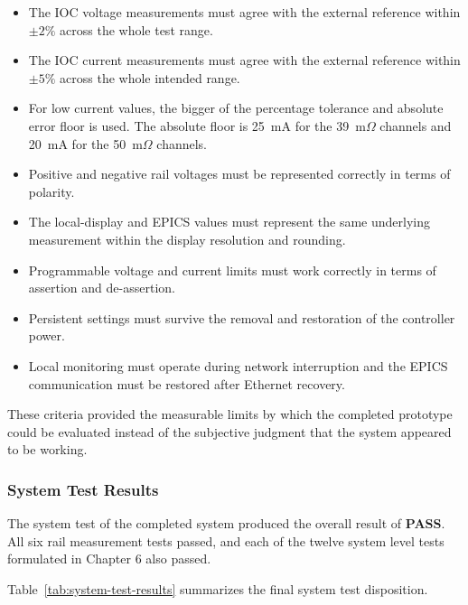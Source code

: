 \begin{itemize}
    \item The IOC voltage measurements must agree with the external reference within $\pm2\%$ across the whole test range.
    \item The IOC current measurements must agree with the external reference within $\pm5\%$ across the whole intended range.
    \item For low current values, the bigger of the percentage tolerance and absolute error floor is used. The absolute floor is 25~mA for the 39~m$\Omega$ channels and 20~mA for the 50~m$\Omega$ channels.
    \item Positive and negative rail voltages must be represented correctly in terms of polarity.
    \item The local-display and EPICS values must represent the same underlying measurement within the display resolution and rounding.
    \item Programmable voltage and current limits must work correctly in terms of assertion and de-assertion.
    \item Persistent settings must survive the removal and restoration of the controller power.
    \item Local monitoring must operate during network interruption and the EPICS communication must be restored after Ethernet recovery.
\end{itemize}

These criteria provided the measurable limits by which the completed prototype could be evaluated instead of the subjective judgment that the system appeared to be working.

\subsubsection{System Test Results}

The system test of the completed system produced the overall result of \textbf{PASS}. All six rail measurement tests passed, and each of the twelve system level tests formulated in Chapter 6 also passed.

Table~\ref{tab:system-test-results} summarizes the final system test disposition.

